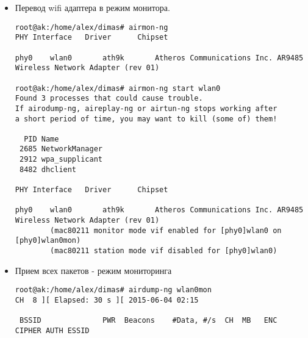 \documentclass[10pt,a4paper]{article}
\begin{document}
\begin{itemize}

\item 
Перевод wifi адаптера в режим монитора.

\begin{lstlisting}
root@ak:/home/alex/dimas# airmon-ng 
PHY	Interface	Driver		Chipset

phy0	wlan0		ath9k		Atheros Communications Inc. AR9485 Wireless Network Adapter (rev 01)

root@ak:/home/alex/dimas# airmon-ng start wlan0
Found 3 processes that could cause trouble.
If airodump-ng, aireplay-ng or airtun-ng stops working after
a short period of time, you may want to kill (some of) them!

  PID Name
 2685 NetworkManager
 2912 wpa_supplicant
 8482 dhclient

PHY	Interface	Driver		Chipset

phy0	wlan0		ath9k		Atheros Communications Inc. AR9485 Wireless Network Adapter (rev 01)
		(mac80211 monitor mode vif enabled for [phy0]wlan0 on [phy0]wlan0mon)
		(mac80211 station mode vif disabled for [phy0]wlan0)
\end{lstlisting}


\item Прием всех пакетов - режим мониторинга

\begin{lstlisting}
root@ak:/home/alex/dimas# airdump-ng wlan0mon
CH  8 ][ Elapsed: 30 s ][ 2015-06-04 02:15                                         
                                                                                                                                                                                                                                            
 BSSID              PWR  Beacons    #Data, #/s  CH  MB   ENC  CIPHER AUTH ESSID
                                                                                                                                                                                                                                            

\end{lstlisting}
\end{itemize}
\end{document}
